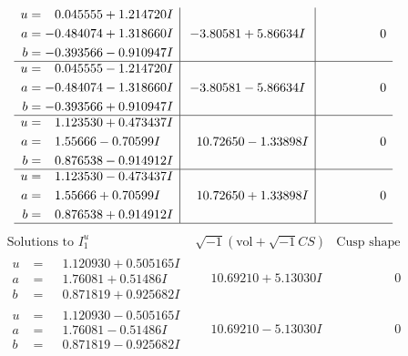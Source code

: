 \documentclass[1p]{elsarticle_modified}
\theoremstyle{definition}
\newcommand{\I}{\sqrt{-1}}
\begin{document}
$$\begin{array}{c|c|c}
\begin{aligned}
u &= \phantom{-}0.045555 + 1.214720 I \\
a &= -0.484074 + 1.318660 I \\
b &= -0.393566 - 0.910947 I\end{aligned}
 & -3.80581 + 5.86634 I & \phantom{-0.000000 } 0 \\ \hline\begin{aligned}
u &= \phantom{-}0.045555 - 1.214720 I \\
a &= -0.484074 - 1.318660 I \\
b &= -0.393566 + 0.910947 I\end{aligned}
 & -3.80581 - 5.86634 I & \phantom{-0.000000 } 0 \\ \hline\begin{aligned}
u &= \phantom{-}1.123530 + 0.473437 I \\
a &= \phantom{-}1.55666 - 0.70599 I \\
b &= \phantom{-}0.876538 - 0.914912 I\end{aligned}
 & \phantom{-}10.72650 - 1.33898 I & \phantom{-0.000000 } 0 \\ \hline\begin{aligned}
u &= \phantom{-}1.123530 - 0.473437 I \\
a &= \phantom{-}1.55666 + 0.70599 I \\
b &= \phantom{-}0.876538 + 0.914912 I\end{aligned}
 & \phantom{-}10.72650 + 1.33898 I & \phantom{-0.000000 } 0\\
 \hline 
 \end{array}$$\newpage$$\begin{array}{c|c|c}  
\text{Solutions to }I^u_{1}& \I (\text{vol} + \sqrt{-1}CS) & \text{Cusp shape}\\
 \hline 
\begin{aligned}
u &= \phantom{-}1.120930 + 0.505165 I \\
a &= \phantom{-}1.76081 + 0.51486 I \\
b &= \phantom{-}0.871819 + 0.925682 I\end{aligned}
 & \phantom{-}10.69210 + 5.13030 I & \phantom{-0.000000 } 0 \\ \hline\begin{aligned}
u &= \phantom{-}1.120930 - 0.505165 I \\
a &= \phantom{-}1.76081 - 0.51486 I \\
b &= \phantom{-}0.871819 - 0.925682 I\end{aligned}
 & \phantom{-}10.69210 - 5.13030 I & \phantom{-0.000000 } 0 \\ \hline\begin{aligned}

\end{aligned}
\end{array}$$
\end{document}
